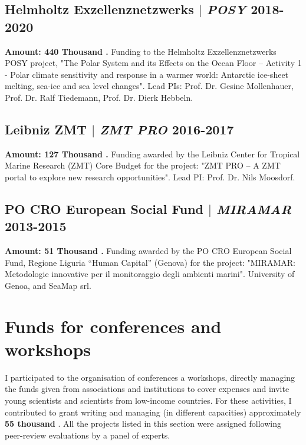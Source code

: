 \documentclass[11pt]{article}
\begin{document}
\subsection{Helmholtz Exzellenznetzwerks  $|$ {\normalfont\textit{POSY}} \hfill 2018-2020}
{\footnotesize \textbf{Amount: 440 Thousand \texteuro.}  Funding to the Helmholtz Exzellenznetzwerks POSY project, "The Polar System and its Effects on the Ocean Floor – Activity 1 - Polar climate sensitivity and response in a warmer world: Antarctic ice-sheet melting, sea-ice and sea level changes". Lead PIs: Prof. Dr. Gesine Mollenhauer, Prof. Dr. Ralf Tiedemann, Prof. Dr. Dierk Hebbeln.}
\bigskip

\subsection{Leibniz ZMT  $|$ {\normalfont\textit{ZMT PRO}} \hfill 2016-2017}
{\footnotesize \textbf{Amount: 127 Thousand \texteuro.} Funding awarded by the Leibniz Center for Tropical Marine Research (ZMT) Core Budget for the project: "ZMT PRO – A ZMT portal to explore new research opportunities". Lead PI: Prof. Dr. Nils Moosdorf.}
\bigskip

\subsection{PO CRO European Social Fund  $|$ {\normalfont\textit{MIRAMAR}} \hfill 2013-2015}
{\footnotesize \textbf{Amount: 51 Thousand \texteuro.} Funding awarded by the PO CRO European Social Fund, Regione Liguria “Human Capital” (Genova) for the project: "MIRAMAR: Metodologie innovative per il monitoraggio degli ambienti marini". University of Genoa, and SeaMap srl.}
\bigskip

\section{Funds for conferences and workshops}
{\normalfont I participated to the organisation of conferences a workshops, directly managing the funds given from associations and institutions to cover expenses and invite young scientists and scientists from low-income countries. For these activities, I contributed to grant writing and managing (in different capacities) approximately \textbf{55 thousand \texteuro}. All the projects listed in this section were assigned following peer-review evaluations by a panel of experts.}\\

\bigskip
\end{document}
